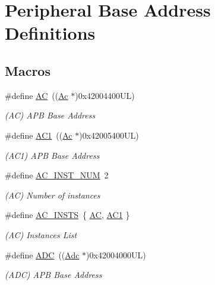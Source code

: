 \hypertarget{group___s_a_m_d21_e15_l__base}{}\section{Peripheral Base Address Definitions}
\label{group___s_a_m_d21_e15_l__base}
\subsection*{Macros}
\begin{DoxyCompactItemize}
\item 
\#define \mbox{\hyperlink{group___s_a_m_d21_e15_l__base_ga67d1a34c515736c571484ec2a3543da5}{AC}}~((\mbox{\hyperlink{struct_ac}{Ac}}       $\ast$)0x42004400\+U\+L)
\begin{DoxyCompactList}\small\item\em (AC) A\+PB Base Address \end{DoxyCompactList}\item 
\#define \mbox{\hyperlink{group___s_a_m_d21_e15_l__base_gaae37ea25cccdac03dea26df427df9cf4}{A\+C1}}~((\mbox{\hyperlink{struct_ac}{Ac}}       $\ast$)0x42005400\+U\+L)
\begin{DoxyCompactList}\small\item\em (A\+C1) A\+PB Base Address \end{DoxyCompactList}\item 
\#define \mbox{\hyperlink{group___s_a_m_d21_e15_l__base_ga4bb4da47440a75059a698577c3038483}{A\+C\+\_\+\+I\+N\+S\+T\+\_\+\+N\+UM}}~2
\begin{DoxyCompactList}\small\item\em (AC) Number of instances \end{DoxyCompactList}\item 
\#define \mbox{\hyperlink{group___s_a_m_d21_e15_l__base_ga02e4d15d1fb2a4b3b8440ce6ffede047}{A\+C\+\_\+\+I\+N\+S\+TS}}~\{ \mbox{\hyperlink{group___s_a_m_d21_j18_a__base_ga67d1a34c515736c571484ec2a3543da5}{AC}}, \mbox{\hyperlink{group___s_a_m_d21_g16_l__base_gaae37ea25cccdac03dea26df427df9cf4}{A\+C1}} \}
\begin{DoxyCompactList}\small\item\em (AC) Instances List \end{DoxyCompactList}\item 
\#define \mbox{\hyperlink{group___s_a_m_d21_e15_l__base_ga54d148b91f3d356713f7e367a2243bea}{A\+DC}}~((\mbox{\hyperlink{struct_adc}{Adc}}      $\ast$)0x42004000\+U\+L)
\begin{DoxyCompactList}\small\item\em (A\+DC) A\+PB Base Address \end{DoxyCompactList}\item 

\end{DoxyCompactItemize}
